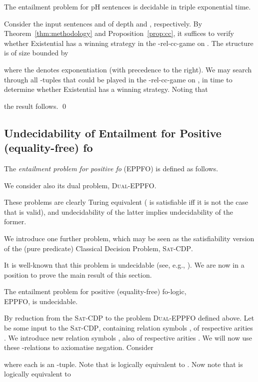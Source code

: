 \documentclass{LMCS}
\begin{document}
\begin{thm}
The entailment problem for pH sentences is decidable in triple exponential time.
\end{thm}
\proof
Consider the input sentences  and  of depth  and , respectively. By Theorem~\ref{thm:methodology} and Proposition~\ref{prop:cc}, it suffices to verify whether Existential has a winning strategy in the -rel-cc-game on . The structure  is of size bounded by

where the  denotes exponentiation (with precedence to the right).
We may search through all -tuples that could be played in the -rel-cc-game on , in time  to determine whether Existential has a winning strategy. Noting that

the result follows.
\qed

\subsection{Undecidability of Entailment for Positive (equality-free) fo}
\label{LHS:sec:undecidable}

The \emph{entailment problem for positive fo} (\textsc{EPPFO}) is defined as follows.

We consider also its dual problem, \textsc{Dual-EPPFO}.

These problems are clearly Turing equivalent ( is satisfiable iff it is not the case that  is valid), and undecidability of the latter implies undecidability of the former.

We introduce one further problem, which may be seen as the satisfiability version of the (pure predicate) Classical Decision Problem, \textsc{Sat-CDP}.

It is well-known that this problem is undecidable (see, e.g., \cite{CDP}). We are now in a position to prove the main result of this section.
\begin{thm}
The entailment problem for positive (equality-free) fo-logic, \\ \textsc{EPPFO}, is undecidable.
\end{thm}
\proof
By reduction from the \textsc{Sat-CDP} to the problem \textsc{Dual-EPPFO} defined above. Let  be some input to the \textsc{Sat-CDP}, containing relation symbols , of respective arities . We introduce  new relation symbols , also of respective arities . We will now use these -relations to axiomatise negation. Consider



where each  is an -tuple. Note that  is logically equivalent to . Now note that  is logically equivalent to 
\end{document}
